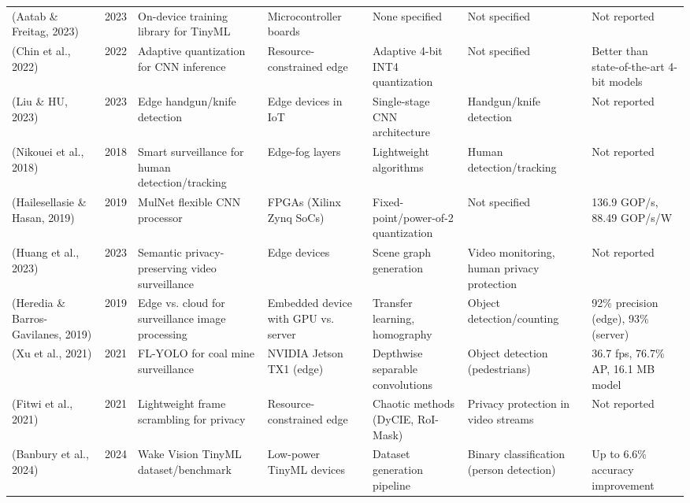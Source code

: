 \documentclass[12pt, a4paper]{article}
\begin{document}
\begin{landscape}
\begin{longtable}{ p{3.5cm} p{0.8cm} p{3.5cm} p{3cm} p{3.5cm} p{3.5cm} p{3.5cm} }
(Aatab \& Freitag, 2023) \cite{aatab2023} & 2023 & On-device training library for TinyML & Microcontroller boards & None specified & Not specified & Not reported \\

(Chin et al., 2022) \cite{chin2022} & 2022 & Adaptive quantization for CNN inference & Resource-constrained edge & Adaptive 4-bit INT4 quantization & Not specified & Better than state-of-the-art 4-bit models \\

(Liu \& HU, 2023) \cite{liu2023} & 2023 & Edge handgun/knife detection & Edge devices in IoT & Single-stage CNN architecture & Handgun/knife detection & Not reported \\

(Nikouei et al., 2018) \cite{nikouei2018sec} & 2018 & Smart surveillance for human detection/tracking & Edge-fog layers & Lightweight algorithms & Human detection/tracking & Not reported \\

(Hailesellasie \& Hasan, 2019) \cite{hailesellasie2019} & 2019 & MulNet flexible CNN processor & FPGAs (Xilinx Zynq SoCs) & Fixed-point/power-of-2 quantization & Not specified & 136.9 GOP/s, 88.49 GOP/s/W \\

(Huang et al., 2023) \cite{huang2023} & 2023 & Semantic privacy-preserving video surveillance & Edge devices & Scene graph generation & Video monitoring, human privacy protection & Not reported \\

(Heredia \& Barros-Gavilanes, 2019) \cite{heredia2019} & 2019 & Edge vs. cloud for surveillance image processing & Embedded device with GPU vs. server & Transfer learning, homography & Object detection/counting & 92\% precision (edge), 93\% (server) \\

(Xu et al., 2021) \cite{xu2021} & 2021 & FL-YOLO for coal mine surveillance & NVIDIA Jetson TX1 (edge) & Depthwise separable convolutions & Object detection (pedestrians) & 36.7 fps, 76.7\% AP, 16.1 MB model \\

(Fitwi et al., 2021) \cite{fitwi2021} & 2021 & Lightweight frame scrambling for privacy & Resource-constrained edge & Chaotic methods (DyCIE, RoI-Mask) & Privacy protection in video streams & Not reported \\

(Banbury et al., 2024) \cite{banbury2024} & 2024 & Wake Vision TinyML dataset/benchmark & Low-power TinyML devices & Dataset generation pipeline & Binary classification (person detection) & Up to 6.6\% accuracy improvement \\


\end{longtable}
\end{landscape}
\end{document}
